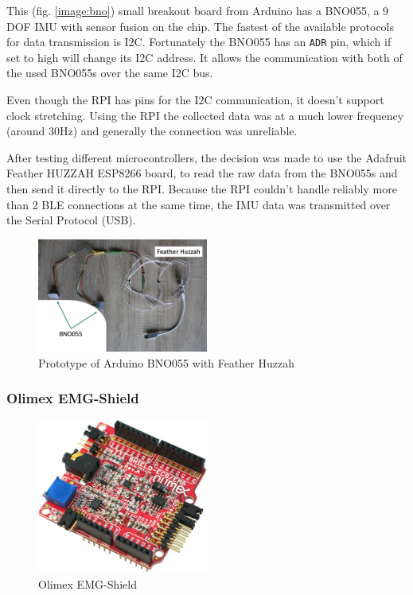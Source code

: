 This (fig. \ref{image:bno}) small breakout board from Arduino has a BNO055, a 9 DOF IMU with sensor fusion on the chip. The fastest of the available protocols for data transmission is I2C. Fortunately the BNO055 has an \texttt{ADR} pin, which if set to high will change its I2C address. It allows the communication with both of the used BNO055s over the same I2C bus.

Even though the RPI has pins for the I2C communication, it doesn't support clock stretching. Using the RPI the collected data was at a much lower frequency (around 30Hz) and generally the connection was unreliable.

After testing different microcontrollers, the decision was made to use the Adafruit Feather HUZZAH ESP8266 board, to read the raw data from the BNO055s and then send it directly to the RPI. Because the RPI couldn't handle reliably more than 2 BLE connections at the same time, the IMU data was transmitted over the Serial Protocol (USB).


\begin{figure}[h!]
\centering
\includegraphics[width=0.5\textwidth]{src/media/hardware/real-bno.png}
\caption{Prototype of Arduino BNO055 with Feather Huzzah}
\label{image:real-bno}
\end{figure}

\subsubsection{Olimex EMG-Shield}
\label{subsub:emg}

\begin{figure}[h!]
\centering
\includegraphics[width=0.5\textwidth]{src/media/hardware/emg.jpg}
\caption{Olimex EMG-Shield}
\label{image:emg}
\end{figure}

